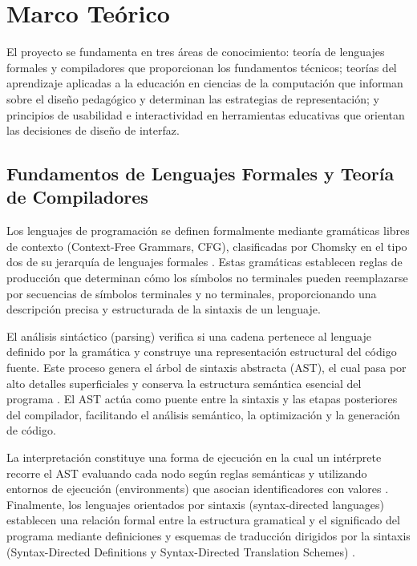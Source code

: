 \section{Marco Teórico}
El proyecto se fundamenta en tres áreas de conocimiento: teoría de lenguajes formales y compiladores que proporcionan los fundamentos técnicos; teorías del aprendizaje aplicadas a la educación en ciencias de la computación que informan sobre el diseño pedagógico y determinan las estrategias de representación; y principios de usabilidad e interactividad en herramientas educativas que orientan las decisiones de diseño de interfaz.

\subsection{Fundamentos de Lenguajes Formales y Teoría de Compiladores}

Los lenguajes de programación se definen formalmente mediante gramáticas libres de contexto (Context-Free Grammars, CFG), clasificadas por Chomsky en el tipo dos de su jerarquía de lenguajes formales \cite{gordon2024linguistics}. Estas gramáticas establecen reglas de producción que determinan cómo los símbolos no terminales pueden reemplazarse por secuencias de símbolos terminales y no terminales, proporcionando una descripción precisa y estructurada de la sintaxis de un lenguaje.

El análisis sintáctico (parsing) verifica si una cadena pertenece al lenguaje definido por la gramática y construye una representación estructural del código fuente. Este proceso genera el árbol de sintaxis abstracta (AST), el cual pasa por alto detalles superficiales y conserva la estructura semántica esencial del programa \cite{10.5555/1177220}. El AST actúa como puente entre la sintaxis y las etapas posteriores del compilador, facilitando el análisis semántico, la optimización y la generación de código.

La interpretación constituye una forma de ejecución en la cual un intérprete recorre el AST evaluando cada nodo según reglas semánticas y utilizando entornos de ejecución (environments) que asocian identificadores con valores \cite{10.5555/1378240}. Finalmente, los lenguajes orientados por sintaxis (syntax-directed languages) establecen una relación formal entre la estructura gramatical y el significado del programa mediante definiciones y esquemas de traducción dirigidos por la sintaxis (Syntax-Directed Definitions y Syntax-Directed Translation Schemes) \cite{10.5555/1177220}. 

